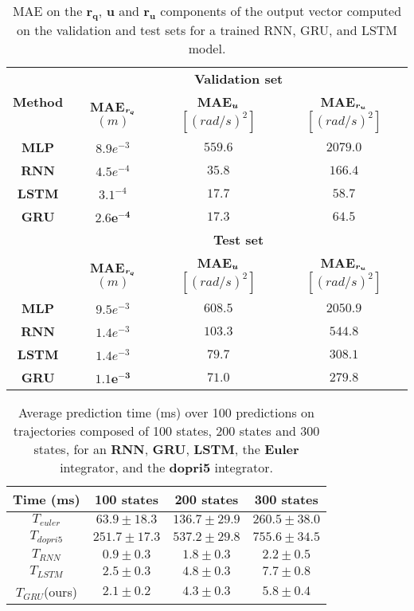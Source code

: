\begin{table}[t]
\centering
\begin{tabular}{ | c | c  c  c | }
\hline
    \multirow{2}{*}{\textbf{Method}} & \multicolumn{3}{c|}{\textbf{Validation set}} \\ \cline{2-4}
    & \textbf{MAE$_{\boldsymbol{r_q}}$} $(m)$  & \textbf{MAE$_{\boldsymbol{u}}$} $[(rad/s)^2]$ & \textbf{MAE$_{\boldsymbol{r_u}}$} $[(rad/s)^2]$ \\ \hline
{\textbf{MLP}} & $8.9e^{-3}$ & $559.6$ & $2079.0$ \\ 
{\textbf{RNN}} & $4.5e^{-4}$ & $35.8$ & $166.4$ \\ 
{\textbf{LSTM}} & $3.1^{-4}$ & $17.7$ & $\boldsymbol{58.7}$ \\ 
{\textbf{GRU}} & $\boldsymbol{2.6e^{-4}}$ & $\boldsymbol{17.3}$ & $64.5$ \\ 
\hline
    & \multicolumn{3}{c|}{\textbf{Test set}}\\ \cline{2-4}
    & \textbf{MAE$_{\boldsymbol{r_q}}$} $(m)$  & \textbf{MAE$_{\boldsymbol{u}}$} $[(rad/s)^2]$ & \textbf{MAE$_{\boldsymbol{r_u}}$} $[(rad/s)^2]$ \\ \hline
{\textbf{MLP}} & $9.5e^{-3}$ & $608.5$ & $2050.9$ \\ 
{\textbf{RNN}} &  $1.4e^{-3}$ & $103.3$ & $544.8$ \\ 
{\textbf{LSTM}} & $1.4e^{-3}$ & $79.7$ & $308.1$ \\ 
{\textbf{GRU}} & $\boldsymbol{1.1e^{-3}}$ & $\boldsymbol{71.0}$ & $\boldsymbol{279.8}$ \\ 
\hline
    
\end{tabular}
\caption{
MAE on the $\boldsymbol{r_q}$, $\boldsymbol{u}$ and $\boldsymbol{r_u}$ components of the output vector computed on the validation and test sets for a trained RNN, GRU, and LSTM model.}
    \label{tab:NN_results_table_Q}
\end{table}

\begin{table}[t]
\centering
\begin{tabular}{ | c | c  c  c | }
\hline
    \textbf{Time (ms)} & 100 states  & 200 states & 300 states \\ \hline
    $T_{euler}$ & $63.9 \pm 18.3$ & $136.7 \pm 29.9$ & $260.5 \pm 38.0$ \\ 
$T_{dopri5}$ & $251.7 \pm 17.3$ & $537.2 \pm 29.8$ & $755.6 \pm 34.5$ \\ 
$T_{RNN}$ & $\boldsymbol{0.9} \pm 0.3$ & $\boldsymbol{1.8} \pm 0.3$ & $\boldsymbol{2.2} \pm 0.5$ \\ 
$T_{LSTM}$ & $2.5 \pm 0.3$ & $4.8 \pm 0.3$ & $7.7 \pm 0.8$ \\ 
$T_{GRU}$(ours) & $2.1 \pm 0.2$ & $4.3 \pm 0.3$ & $5.8 \pm 0.4$  \\ \hline
\end{tabular}
\caption{
Average prediction time (ms) over 100 predictions on trajectories composed of 100 states, 200 states and 300 states, for an \textbf{RNN}, \textbf{GRU}, \textbf{LSTM}, the \textbf{Euler} integrator, and the \textbf{dopri5} integrator.}
    \label{tab:timepred}
\end{table}